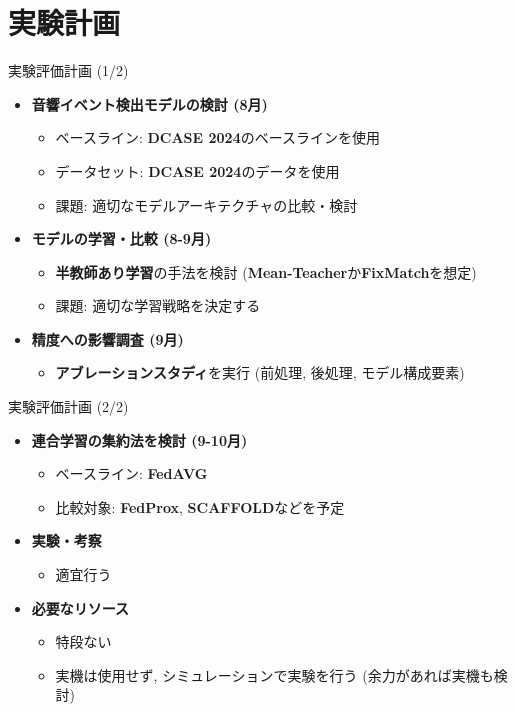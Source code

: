 \documentclass[unicode,12pt,aspectratio=169,dvipdfmx]{beamer}
\begin{document}
\section{実験計画}
\begin{frame}{実験評価計画 (1/2)}
    \begin{itemize}
        \item \textbf{音響イベント検出モデルの検討 (8月)}
        \begin{itemize}
            \item ベースライン: \textbf{DCASE 2024}のベースラインを使用
            \item データセット: \textbf{DCASE 2024}のデータを使用
            \item 課題: 適切なモデルアーキテクチャの比較・検討
        \end{itemize}
        \item \textbf{モデルの学習・比較 (8-9月)}
        \begin{itemize}
            \item \textbf{半教師あり学習}の手法を検討 (\textbf{Mean-Teacher}か\textbf{FixMatch}を想定)
            \item 課題: 適切な学習戦略を決定する
        \end{itemize}
        \item \textbf{精度への影響調査 (9月)}
        \begin{itemize}
            \item \textbf{アブレーションスタディ}を実行 (前処理, 後処理, モデル構成要素)
        \end{itemize}
    \end{itemize}
\end{frame}

\begin{frame}{実験評価計画 (2/2)}
    \begin{itemize}
        \item \textbf{連合学習の集約法を検討 (9-10月)}
        \begin{itemize}
            \item ベースライン: \textbf{FedAVG}
            \item 比較対象: \textbf{FedProx}, \textbf{SCAFFOLD}などを予定
        \end{itemize}
        \item \textbf{実験・考察}
        \begin{itemize}
            \item 適宜行う
        \end{itemize}
        \item \textbf{必要なリソース}
        \begin{itemize}
            \item 特段ない
            \item 実機は使用せず, シミュレーションで実験を行う (余力があれば実機も検討)
        \end{itemize}
    \end{itemize}
\end{frame}
\end{document}
